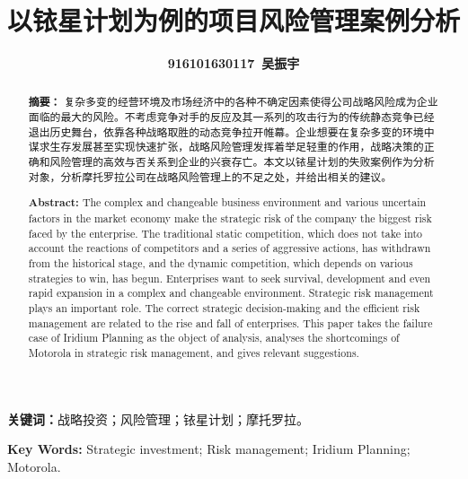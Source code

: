 \documentclass{ctexart}
\begin{document}
\title{\heiti{}\textbf{以铱星计划为例的项目风险管理案例分析}}
\author{\kaishu{}\textbf{916101630117~吴振宇} }
\date{}
\maketitle

{
	\setlength{\baselineskip}{18pt}
	\kaishu

	\renewcommand{\abstractname}{}
	\begin{abstract}
		\noindent
		\textbf{摘要： }复杂多变的经营环境及市场经济中的各种不确定因素使得公司战略风险成为企业面临的最大的风险。不考虑竞争对手的反应及其一系列的攻击行为的传统静态竞争已经退出历史舞台，依靠各种战略取胜的动态竞争拉开帷幕。企业想要在复杂多变的环境中谋求生存发展甚至实现快速扩张，战略风险管理发挥着举足轻重的作用，战略决策的正确和风险管理的高效与否关系到企业的兴衰存亡。本文以铱星计划的失败案例作为分析对象，分析摩托罗拉公司在战略风险管理上的不足之处，并给出相关的建议。
	\end{abstract}

	\textbf{关键词：}战略投资；风险管理；铱星计划；摩托罗拉。

	\renewcommand{\abstractname}{}
	\begin{abstract}
		\noindent
		\textbf{Abstract: }The complex and changeable business environment and various uncertain factors in the market economy make the strategic risk of the company the biggest risk faced by the enterprise. The traditional static competition, which does not take into account the reactions of competitors and a series of aggressive actions, has withdrawn from the historical stage, and the dynamic competition, which depends on various strategies to win, has begun. Enterprises want to seek survival, development and even rapid expansion in a complex and changeable environment. Strategic risk management plays an important role. The correct strategic decision-making and the efficient risk management are related to the rise and fall of enterprises. This paper takes the failure case of Iridium Planning as the object of analysis, analyses the shortcomings of Motorola in strategic risk management, and gives relevant suggestions.
	\end{abstract}

	\textbf{Key Words: }Strategic investment; Risk management; Iridium Planning; Motorola.
}

\pagestyle{fancy}
\renewcommand{\headrulewidth}{0pt}
\rhead{}
\lfoot{\small{\leftmark}}
\rfoot{\small{\rightmark}}
\end{document}
